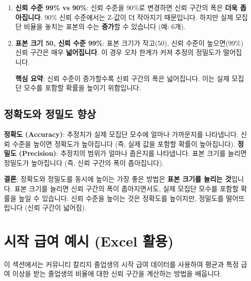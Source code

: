 \documentclass[11pt,a4paper]{article}
\theoremstyle{definition}
\begin{document}
\begin{enumerate}
\begin{enumerate}
\begin{enumerate}
    \item \textbf{신뢰 수준 99\% vs 90\%}:
    신뢰 수준을 90\%로 변경하면 신뢰 구간의 폭은 \textbf{더욱 좁아집니다}. 90\% 신뢰 수준에서는 Z-값이 더 작아지기 때문입니다. 하지만 실제 모집단 비율을 놓치는 표본의 수는 \textbf{증가}할 수 있습니다 (예: 6개).

    \item \textbf{표본 크기 50, 신뢰 수준 99\%}:
    표본 크기가 작고(50), 신뢰 수준이 높으면(99\%) 신뢰 구간은 매우 \textbf{넓어집니다}. 이 경우 오차 한계가 커져 추정의 정밀도가 떨어집니다.
    \begin{summarybox}
        \textbf{핵심 요약}: 신뢰 수준이 증가할수록 신뢰 구간의 폭은 넓어집니다. 이는 실제 모집단 모수를 포함할 확률을 높이기 위함입니다.
    \end{summarybox}
\end{enumerate}

\subsection{정확도와 정밀도 향상}
\begin{examplebox}[title=정확도와 정밀도 향상 전략]
    \textbf{정확도 (Accuracy)}: 추정치가 실제 모집단 모수에 얼마나 가까운지를 나타냅니다. 신뢰 수준을 높이면 정확도가 높아집니다 (즉, 실제 값을 포함할 확률이 높아집니다).
    \textbf{정밀도 (Precision)}: 추정치의 범위가 얼마나 좁은지를 나타냅니다. 표본 크기를 늘리면 정밀도가 높아집니다 (즉, 신뢰 구간의 폭이 좁아집니다).

    \textbf{결론}: 정확도와 정밀도를 동시에 높이는 가장 좋은 방법은 \textbf{표본 크기를 늘리는 것}입니다. 표본 크기를 늘리면 신뢰 구간의 폭이 좁아지면서도, 실제 모집단 모수를 포함할 확률을 높일 수 있습니다. 신뢰 수준을 높이는 것은 정확도를 높이지만, 정밀도를 떨어뜨립니다 (신뢰 구간이 넓어짐).
\end{examplebox}

\newpage
\section{시작 급여 예시 (Excel 활용)}
이 섹션에서는 커뮤니티 칼리지 졸업생의 시작 급여 데이터를 사용하여 평균과 특정 급여 이상을 받는 졸업생의 비율에 대한 신뢰 구간을 계산하는 방법을 배웁니다.


\end{enumerate}
\end{enumerate}
\end{document}
